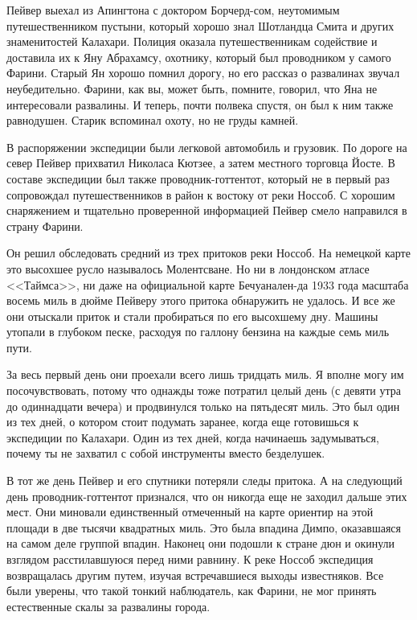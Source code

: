 \documentclass[12pt,a4paper,twoside,openany,svgnames]{memoir}
\begin{document}
Пейвер выехал из Апингтона с доктором Борчерд-сом, неутомимым путешественником пустыни, который хорошо знал Шотландца Смита и других знаменитостей Калахари. Полиция оказала путешественникам содействие и доставила их к Яну Абрахамсу, охотнику, который был проводником у самого Фарини. Старый Ян хорошо помнил дорогу, но его рассказ о развалинах звучал неубедительно. Фарини, как вы, может быть, помните, говорил, что Яна не интересовали развалины. И теперь, почти полвека спустя, он был к ним также равнодушен. Старик вспоминал охоту, но не груды камней.

В распоряжении экспедиции были легковой автомобиль и грузовик. По дороге на север Пейвер прихватил Николаса Кютзее, а затем местного торговца Йосте. В составе экспедиции был также проводник-готтентот, который не в первый раз сопровождал путешественников в район к востоку от реки Носсоб. С хорошим снаряжением и тщательно проверенной информацией Пейвер смело направился в страну Фарини.

Он решил обследовать средний из трех притоков реки Носсоб. На немецкой карте это высохшее русло называлось Молентсване. Но ни в лондонском атласе <<Таймса>>, ни даже на официальной карте Бечуанален-да 1933 года масштаба восемь миль в дюйме Пейверу этого притока обнаружить не удалось. И все же они отыскали приток и стали пробираться по его высохшему дну. Машины утопали в глубоком песке, расходуя по галлону бензина на каждые семь миль пути.

За весь первый день они проехали всего лишь тридцать миль. Я вполне могу им посочувствовать, потому что однажды тоже потратил целый день (с девяти утра до одиннадцати вечера) и продвинулся только на пятьдесят миль. Это был один из тех дней, о котором стоит подумать заранее, когда еще готовишься к экспедиции по Калахари. Один из тех дней, когда начинаешь задумываться, почему ты не захватил с собой инструменты вместо безделушек.

В тот же день Пейвер и его спутники потеряли следы притока. А на следующий день проводник-готтентот признался, что он никогда еще не заходил дальше этих мест. Они миновали единственный отмеченный на карте ориентир на этой площади в две тысячи квадратных миль. Это была впадина Димпо, оказавшаяся на самом деле группой впадин. Наконец они подошли к стране дюн и окинули взглядом расстилавшуюся перед ними равнину. К реке Носсоб экспедиция возвращалась другим путем, изучая встречавшиеся выходы известняков. Все были уверены, что такой тонкий наблюдатель, как Фарини, не мог принять естественные скалы за развалины города.
\end{document}
